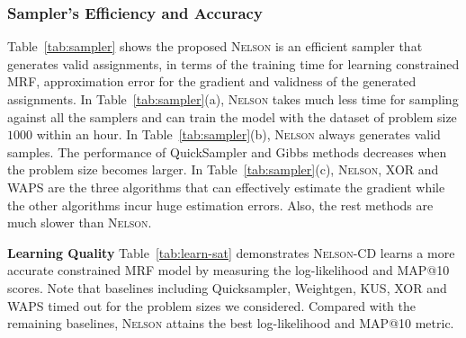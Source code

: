 \documentclass[letterpaper]{article} %
\newcommand{\nls}{\textsc{Nelson}\xspace}
\begin{document}
\subsubsection{Sampler's Efficiency and Accuracy}  Table~\ref{tab:sampler} shows the proposed \nls is an efficient sampler  that generates valid assignments, in terms of the training time for learning constrained MRF, approximation error for the gradient and  validness of the generated  assignments. In Table~\ref{tab:sampler}(a), \nls takes much less time for sampling against all the samplers and can train the model with the dataset of problem size $1000$ within an hour. In Table~\ref{tab:sampler}(b), \nls always generates valid samples. {The performance of} QuickSampler and Gibbs methods decreases when the problem size becomes larger.  In Table~\ref{tab:sampler}(c), \nls, XOR and WAPS are the three algorithms that can effectively estimate the gradient while the other algorithms incur huge estimation errors. Also, the rest methods are much slower than \nls. %

\noindent\textbf{Learning Quality}  Table~\ref{tab:learn-sat} demonstrates \nls-CD learns a more accurate  constrained MRF model by measuring the log-likelihood and MAP@10 scores. Note that baselines including Quicksampler, Weightgen, KUS, XOR and WAPS  timed out for the problem sizes we considered. Compared with the remaining baselines,  \nls attains the best log-likelihood and MAP@10 metric. 
\end{document}
